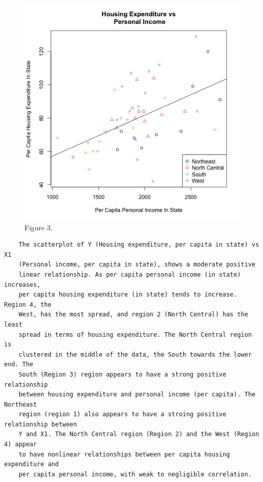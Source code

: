 \documentclass[12pt,letterpaper]{article}
\begin{document}
\begin{itemize}
\begin{figure}[h!]\centering
	\caption{\footnotesize Figure 3.}
	\label{fig:plot_3}
	\includegraphics[width=.75\textwidth]{housing_expenditure_personal_income_scatter_plot.png}
\end{figure}
\begin{verbatim}
	The scatterplot of Y (Housing expenditure, per capita in state) vs X1 
	(Personal income, per capita in state), shows a moderate positive 
	linear relationship. As per capita personal income (in state) increases, 
	per capita housing expenditure (in state) tends to increase. Region 4, the 
	West, has the most spread, and region 2 (North Central) has the least 
	spread in terms of housing expenditure. The North Central region is 
	clustered in the middle of the data, the South towards the lower end. The
	South (Region 3) region appears to have a strong positive relationship 
	between	housing expenditure and personal income (per capita). The Northeast
	region (region 1) also appears to have a stroing positive relationship between 
	Y and X1. The North Central region (Region 2) and the West (Region 4) appear 
	to have nonlinear relationships between per capita housing expenditure and 
	per capita personal income, with weak to negligible correlation. 
	
\end{verbatim}





\end{itemize}
\end{document}
